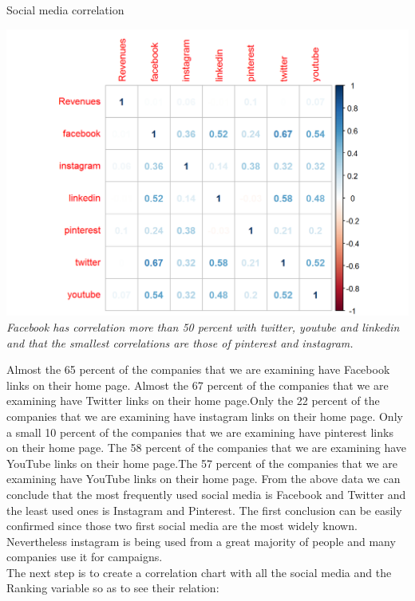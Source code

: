 \documentclass{book}
\begin{document}
\begin{table}[H]
\centering
\caption{Social media correlation}
\begin{center}
\includegraphics[scale=0.5]{../R/photos/22_REV_SM.png}  \\
\textit{Facebook has correlation more than 50 percent with twitter, youtube and linkedin and that the smallest correlations are those of pinterest and instagram.}
\end{center}
\end{table}
Almost the 65 percent of the companies that we are examining have Facebook links on their home page. Almost the 67 percent of the companies that we are examining have Twitter links on their home page.Only the 22 percent of the companies that we are examining have instagram links on their home page. Only a small 10 percent of the companies that we are examining have pinterest links on their home page. The 58 percent of the companies that we are examining have YouTube links on their home page.The 57 percent of the companies that we are examining have YouTube links on their home page. From the above data we can conclude that the most frequently used social media is Facebook and Twitter and the least used ones is Instagram and Pinterest. The first conclusion can be easily confirmed since those two first social media are the most widely known. Nevertheless instagram is being used from a great majority of people and many companies use it for campaigns.\\
The next step is to create a correlation chart with all the social media and the Ranking variable so as to see their relation:
\end{document}
